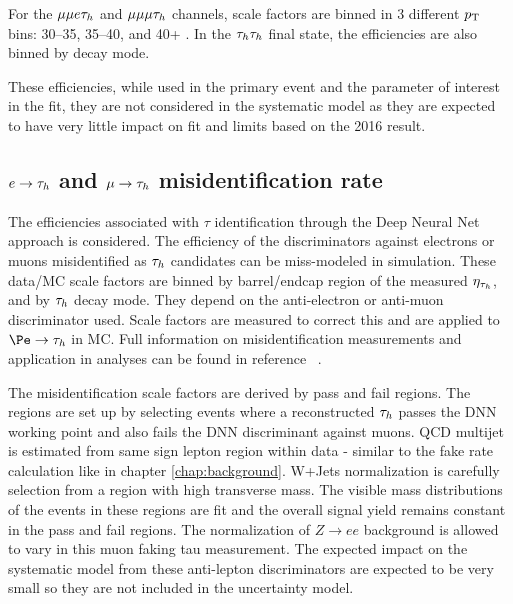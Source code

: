 For the $\mu\mu e \tau_h$ and $\mu\mu\mu\tau_h$ channels, scale factors are binned in 3 different $p_{\mathrm{T}}$ bins: 30--35, 35--40, and 40+ \GeV. In the $\tau_h\tau_h$ final state, the efficiencies are also binned by decay mode. 


These efficiencies, while used in the primary event and the parameter of interest in the fit, they are not considered in the systematic model as they are expected to have very little impact on fit and limits based on the 2016 result. 


\subsection{$e \rightarrow \tau_h$  and $\mu \rightarrow \tau_h$ misidentification rate}
The efficiencies associated with $\tau$ identification through the Deep Neural Net approach is considered. 
The efficiency of the discriminators against electrons or muons misidentified as $\tau_h$ candidates can be miss-modeled in simulation. 
These data/MC scale factors are
binned by barrel/endcap region of the measured $\eta_{\tau_h}$, and by $\tau_h$ decay mode. They depend on the anti-electron or anti-muon discriminator used. 
Scale factors are measured to correct this and are applied to $\Pe \rightarrow \tauh$ in MC. Full information on misidentification measurements and application in analyses can be found in reference ~\cite{TAUIDTwiki}. 


The misidentification scale factors are derived by pass and fail regions. The regions are set up by selecting events where a reconstructed $\tau_h$ passes the DNN working point and also fails the DNN discriminant against muons. QCD multijet is estimated from same sign lepton region within data - similar to the fake rate calculation like in chapter \ref{chap:background}. W+Jets normalization is carefully selection from a region with high transverse mass. The visible mass distributions of the events in these regions are fit and the overall signal yield remains constant in the pass and fail regions. The normalization of $Z \to e e $ background is allowed to vary in this muon faking tau measurement.   
The expected impact on the systematic model from these anti-lepton discriminators are expected to be very small so they are not included in the uncertainty model.

